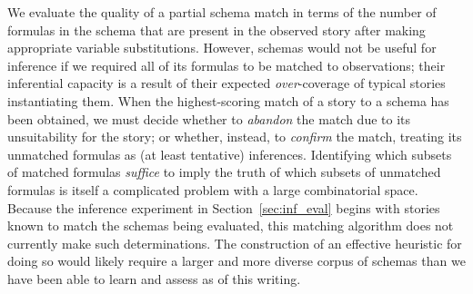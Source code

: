 We evaluate the quality of a partial schema match in terms of the number of formulas in the schema that are present in the observed story after making appropriate variable substitutions. However, schemas would not be useful for inference if we required all of its formulas to be matched to observations; their inferential capacity is a result of their expected \textit{over}-coverage of typical stories instantiating them. When the highest-scoring match of a story to a schema has been obtained, we must decide whether to \textit{abandon} the match due to its unsuitability for the story; or whether, instead, to \textit{confirm} the match, treating its unmatched formulas as (at least tentative) inferences. Identifying which subsets of matched formulas \textit{suffice} to imply the truth of which subsets of unmatched formulas is itself a complicated problem with a large combinatorial space. Because the inference experiment in Section~\ref{sec:inf_eval} begins with stories known to match the schemas being evaluated, this matching algorithm does not currently make such determinations. The construction of an effective heuristic for doing so would likely require a larger and more diverse corpus of schemas than we have been able to learn and assess as of this writing.
